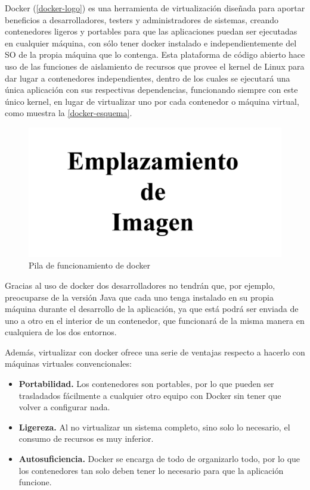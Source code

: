 Docker (\autoref{docker-logo}) es una herramienta de virtualización diseñada para aportar beneficios a desarrolladores, testers y administradores de sistemas, creando contenedores ligeros y portables para que las aplicaciones puedan ser ejecutadas en cualquier máquina, con sólo tener docker instalado e independientemente del \gls{SO} de la propia máquina que lo contenga\cite{garciaoterino2015}. Esta plataforma de código abierto hace uso de las funciones de aislamiento de recursos que provee el kernel de Linux para dar lugar a contenedores independientes, dentro de los cuales se ejecutará una única aplicación con sus respectivas dependencias, funcionando siempre con este único kernel, en lugar de virtualizar uno por cada contenedor o máquina virtual, como muestra la \autoref{docker-esquema}.

\begin{figure}[htbp]
	\centering
	\includegraphics[width=0.80\linewidth]
	{figuras/emplazamiento-imagen.png}
	\caption{Pila de funcionamiento de docker}
	\label{docker-esquema}
\end{figure}

Gracias al uso de docker dos desarrolladores no tendrán que, por ejemplo, preocuparse de la versión Java que cada uno tenga instalado en su propia máquina durante el desarrollo de la aplicación, ya que está podrá ser enviada de uno a otro en el interior de un contenedor, que funcionará de la misma manera en cualquiera de los dos entornos.

Además, virtualizar con docker ofrece una serie de ventajas respecto a hacerlo con máquinas virtuales convencionales\cite{velazco2016}:

\begin{itemize}
	\item \textbf{Portabilidad.} Los contenedores son portables, por lo que pueden ser trasladados fácilmente a cualquier otro equipo con Docker sin tener que volver a configurar nada.
	\item \textbf{Ligereza.} Al no virtualizar un sistema completo, sino solo lo necesario, el consumo de recursos es muy inferior.
	\item \textbf{Autosuficiencia.} Docker se encarga de todo de organizarlo todo, por lo que los contenedores tan solo deben tener lo necesario para que la aplicación funcione.
\end{itemize}

